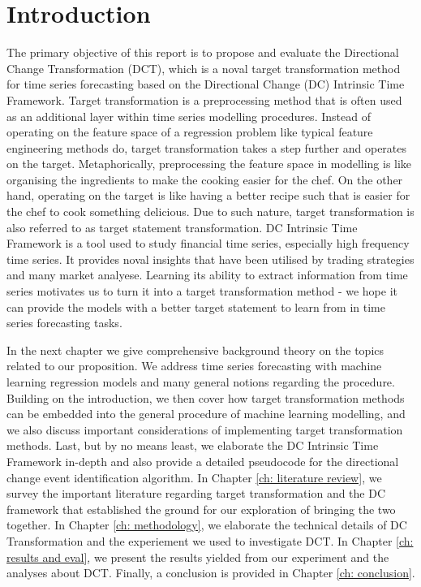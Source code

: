 \chapter{Introduction}
The primary objective of this report is to propose and evaluate the Directional Change Transformation (DCT), which is a noval target transformation method for time series forecasting based on the Directional Change (DC) Intrinsic Time Framework. Target transformation is a preprocessing method that is often used as an additional layer within time series modelling procedures. Instead of operating on the feature space of a regression problem like typical feature engineering methods do, target transformation takes a step further and operates on the target. Metaphorically, preprocessing the feature space in modelling is like organising the ingredients to make the cooking easier for the chef. On the other hand, operating on the target is like having a better recipe such that is easier for the chef to cook something delicious. Due to such nature, target transformation is also referred to as target statement transformation. DC Intrinsic Time Framework is a tool used to study financial time series, especially high frequency time series. It provides noval insights that have been utilised by trading strategies and many market analyese. Learning its ability to extract information from time series motivates us to turn it into a target transformation method - we hope it can provide the models with a better target statement to learn from in time series forecasting tasks.

In the next chapter we give comprehensive background theory on the topics related to our proposition. We address time series forecasting with machine learning regression models and many general notions regarding the procedure. Building on the introduction, we then cover how target transformation methods can be embedded into the general procedure of machine learning modelling, and we also discuss important considerations of implementing target transformation methods. Last, but by no means least, we elaborate the DC Intrinsic Time Framework in-depth and also provide a detailed pseudocode for the directional change event identification algorithm. In Chapter \ref{ch: literature review}, we survey the important literature regarding target transformation and the DC framework that established the ground for our exploration of bringing the two together. In Chapter \ref{ch: methodology}, we elaborate the technical details of DC Transformation and the experiement we used to investigate DCT. In Chapter \ref{ch: results and eval}, we present the results yielded from our experiment and the analyses about DCT. Finally, a conclusion is provided in Chapter \ref{ch: conclusion}.
